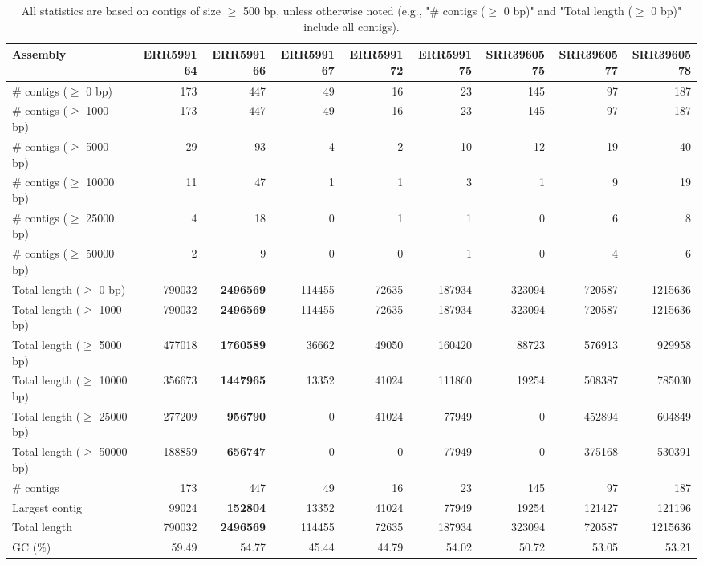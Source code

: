 \documentclass[12pt,a4paper]{article}
\begin{document}
\begin{table}[ht]
\begin{center}
\caption{All statistics are based on contigs of size $\geq$ 500 bp, unless otherwise noted (e.g., "\# contigs ($\geq$ 0 bp)" and "Total length ($\geq$ 0 bp)" include all contigs).}
\begin{tabular}{|l*{8}{|r}|}
\hline
Assembly & ERR599164 & ERR599166 & ERR599167 & ERR599172 & ERR599175 & SRR3960575 & SRR3960577 & SRR3960578 \\ \hline
\# contigs ($\geq$ 0 bp) & 173 & 447 & 49 & 16 & 23 & 145 & 97 & 187 \\ \hline
\# contigs ($\geq$ 1000 bp) & 173 & 447 & 49 & 16 & 23 & 145 & 97 & 187 \\ \hline
\# contigs ($\geq$ 5000 bp) & 29 & 93 & 4 & 2 & 10 & 12 & 19 & 40 \\ \hline
\# contigs ($\geq$ 10000 bp) & 11 & 47 & 1 & 1 & 3 & 1 & 9 & 19 \\ \hline
\# contigs ($\geq$ 25000 bp) & 4 & 18 & 0 & 1 & 1 & 0 & 6 & 8 \\ \hline
\# contigs ($\geq$ 50000 bp) & 2 & 9 & 0 & 0 & 1 & 0 & 4 & 6 \\ \hline
Total length ($\geq$ 0 bp) & 790032 & {\bf 2496569} & 114455 & 72635 & 187934 & 323094 & 720587 & 1215636 \\ \hline
Total length ($\geq$ 1000 bp) & 790032 & {\bf 2496569} & 114455 & 72635 & 187934 & 323094 & 720587 & 1215636 \\ \hline
Total length ($\geq$ 5000 bp) & 477018 & {\bf 1760589} & 36662 & 49050 & 160420 & 88723 & 576913 & 929958 \\ \hline
Total length ($\geq$ 10000 bp) & 356673 & {\bf 1447965} & 13352 & 41024 & 111860 & 19254 & 508387 & 785030 \\ \hline
Total length ($\geq$ 25000 bp) & 277209 & {\bf 956790} & 0 & 41024 & 77949 & 0 & 452894 & 604849 \\ \hline
Total length ($\geq$ 50000 bp) & 188859 & {\bf 656747} & 0 & 0 & 77949 & 0 & 375168 & 530391 \\ \hline
\# contigs & 173 & 447 & 49 & 16 & 23 & 145 & 97 & 187 \\ \hline
Largest contig & 99024 & {\bf 152804} & 13352 & 41024 & 77949 & 19254 & 121427 & 121196 \\ \hline
Total length & 790032 & {\bf 2496569} & 114455 & 72635 & 187934 & 323094 & 720587 & 1215636 \\ \hline
GC (\%) & 59.49 & 54.77 & 45.44 & 44.79 & 54.02 & 50.72 & 53.05 & 53.21 \\ \hline

\end{tabular}
\end{center}
\end{table}
\end{document}
